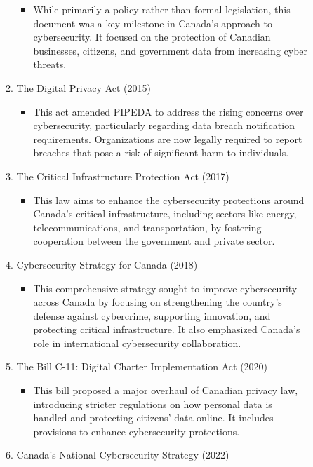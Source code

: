 \begin{enumerate}
\begin{description}
\begin{enumerate}[label=\arabic*., leftmargin=-0.5em]
			\begin{itemize}
				\item While primarily a policy rather than formal legislation, this document was a key milestone in Canada’s approach to cybersecurity.
					It focused on the protection of Canadian businesses, citizens, and government data from increasing cyber threats.
			\end{itemize}
			\item The Digital Privacy Act (2015)
			\begin{itemize}
				\item This act amended PIPEDA to address the rising concerns over cybersecurity, particularly regarding data breach notification requirements.
					Organizations are now legally required to report breaches that pose a risk of significant harm to individuals.
			\end{itemize}
			\item The Critical Infrastructure Protection Act (2017)
			\begin{itemize}
				\item This law aims to enhance the cybersecurity protections around Canada’s critical infrastructure, including sectors like energy, telecommunications, and transportation, by fostering cooperation between the government and private sector.
			\end{itemize}
			\item Cybersecurity Strategy for Canada (2018)
			\begin{itemize}
				\item This comprehensive strategy sought to improve cybersecurity across Canada by focusing on strengthening the country’s defense against cybercrime, supporting innovation, and protecting critical infrastructure.
					It also emphasized Canada’s role in international cybersecurity collaboration.
			\end{itemize}
			\item The Bill C-11: Digital Charter Implementation Act (2020)
			\begin{itemize}
				\item This bill proposed a major overhaul of Canadian privacy law, introducing stricter regulations on how personal data is handled and protecting citizens’ data online.
					It includes provisions to enhance cybersecurity protections.
			\end{itemize}
			\item Canada’s National Cybersecurity Strategy (2022)
			\begin{itemize}

\end{itemize}
\end{enumerate}
\end{description}
\end{enumerate}

